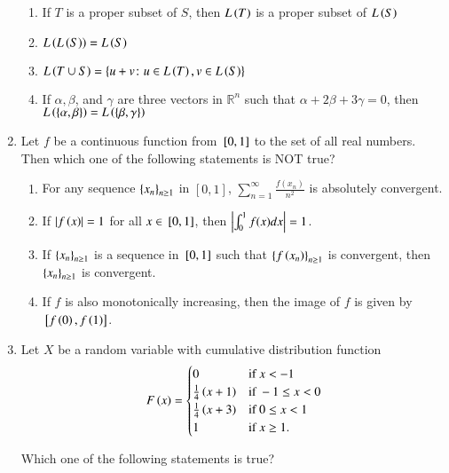 \documentclass[journal,12pt,onecolumn]{IEEEtran}
\theoremstyle{remark}
\begin{document}
\begin{enumerate}
    \begin{enumerate}
        \item If $T$ is a proper subset of $S$, then $L\left(T\right)$ is a proper subset of $L\left(S\right)$
        \item $L\left(L\left(S\right)\right) = L\left(S\right)$
        \item $L\left(T \cup S\right) = \left\{u + v\colon u \in L\left(T\right), v \in L\left(S\right)\right\}$
        \item If $\alpha, \beta$, and $\gamma$ are three vectors in $\mathbb{R}^n$ such that $\alpha + 2\beta + 3\gamma = 0$, then $L\left(\left\{\alpha, \beta\right\}\right) = L\left(\left\{\beta, \gamma\right\}\right)$\\
    \end{enumerate}
    \item Let $f$ be a continuous function from ${}\left[0,1\right]$ to the set of all real numbers. Then which one of the following statements is NOT true?  
\begin{enumerate}
\item For any sequence $\left\{x_n\right\}_{n \geq 1}$ in $[0,1]$, $\sum_{n=1}^{\infty} \frac{f(x_n)}{n^2}$ is absolutely convergent.
\item If $\left\vert f\left(x\right)\right\vert = 1$ for all $x \in {}\left[0,1\right]$, then $\left\vert\int_{0}^{1} f(x) dx\right\vert = 1$.
\item If $\left\{x_n\right\}_{n \geq 1}$ is a sequence in ${}\left[0,1\right]$ such that $\left\{f\left(x_n\right)\right\}_{n \geq 1}$ is convergent, then $\left\{x_n\right\}_{n \geq 1}$ is convergent.
\item If $f$ is also monotonically increasing, then the image of $f$ is given by ${}\left[f\left(0\right), f\left(1\right)\right]$.
\end{enumerate}
\item Let $X$ be a random variable with cumulative distribution function
\begin{align}
F\left(x\right) = \begin{cases}
    0 & \text{if } x < -1 \\
    \frac{1}{4}\left(x+1\right) & \text{if } -1 \leq x < 0 \\
    \frac{1}{4}\left(x+3\right) & \text{if } 0 \leq x < 1 \\
    1 & \text{if } x \geq 1.
\end{cases}
\end{align}

Which one of the following statements is true?


\end{enumerate}
\end{document}
